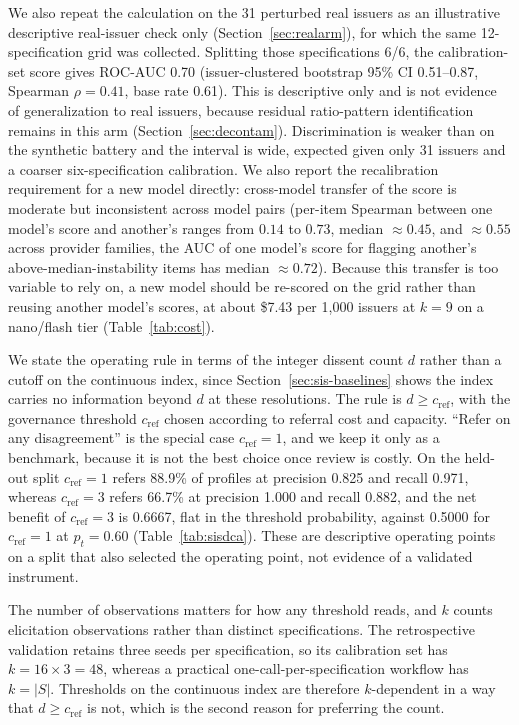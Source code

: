 \documentclass[a4paper,fleqn]{cas-sc}
\begin{document}
We also repeat the calculation on the 31 perturbed real issuers as an illustrative descriptive real-issuer check only (Section~\ref{sec:realarm}), for which the same 12-specification
grid was collected. Splitting those specifications 6/6, the calibration-set score gives ROC-AUC 0.70 (issuer-clustered bootstrap 95\% CI 0.51--0.87, Spearman $\rho=0.41$, base rate 0.61). This is descriptive only and is not evidence of generalization to real issuers, because residual ratio-pattern identification remains in this arm (Section~\ref{sec:decontam}). Discrimination is weaker than on the synthetic battery
and the interval is wide, expected given only 31 issuers and a coarser six-specification
calibration. 
 We also
report the recalibration requirement for a new model directly: cross-model transfer of the score is
moderate but inconsistent across model pairs (per-item Spearman between one model's score and another's
ranges from $0.14$ to $0.73$, median $\approx0.45$, and $\approx0.55$ across provider families, the AUC of
one model's score for flagging another's above-median-instability items has median $\approx0.72$). Because
this transfer is too variable to rely on, a new model should be re-scored on the grid rather than reusing
another model's scores, at about \$7.43 per 1{,}000 issuers at $k=9$ on a
nano/flash tier (Table~\ref{tab:cost}).

We state the operating rule in terms of the integer dissent count $d$ rather than a cutoff on the
continuous index, since Section~\ref{sec:sis-baselines} shows the index carries no information
beyond $d$ at these resolutions. The rule is $d\ge c_{\mathrm{ref}}$, with the governance threshold $c_{\mathrm{ref}}$ chosen
according to referral cost and capacity. ``Refer on any disagreement'' is the special case $c_{\mathrm{ref}}=1$,
and we keep it only as a benchmark, because it is not the best choice once review is costly. On the
held-out split $c_{\mathrm{ref}}=1$ refers 88.9\% of profiles at precision 0.825 and recall 0.971, whereas $c_{\mathrm{ref}}=3$
refers 66.7\% at precision 1.000 and recall 0.882, and the net benefit of $c_{\mathrm{ref}}=3$ is 0.6667, flat in the
threshold probability, against 0.5000 for $c_{\mathrm{ref}}=1$ at $p_t=0.60$ (Table~\ref{tab:sisdca}). These are
descriptive operating points on a split that also selected the operating point, not evidence of a
validated instrument.

The number of observations matters for how any threshold reads, and $k$ counts elicitation
observations rather than distinct specifications. The retrospective validation retains three seeds
per specification, so its calibration set has $k=16\times3=48$, whereas a practical
one-call-per-specification workflow has $k=|S|$. Thresholds on the continuous index are therefore
$k$-dependent in a way that $d\ge c_{\mathrm{ref}}$ is not, which is the second reason for preferring the count.
\end{document}
